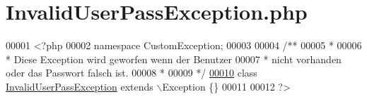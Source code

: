 \hypertarget{_invalid_user_pass_exception_8php}{\section{Invalid\-User\-Pass\-Exception.\-php}
\label{_invalid_user_pass_exception_8php}
}

\begin{DoxyCode}
00001 <?php
00002 \textcolor{keyword}{namespace }CustomException;
00003 \textcolor{comment}{}
00004 \textcolor{comment}{/**}
00005 \textcolor{comment}{ * }
00006 \textcolor{comment}{ * Diese Exception wird geworfen wenn der Benutzer}
00007 \textcolor{comment}{ * nicht vorhanden oder das Passwort falsch ist.}
00008 \textcolor{comment}{ * }
00009 \textcolor{comment}{ */}
\hypertarget{_invalid_user_pass_exception_8php_source_l00010}{}\hyperlink{class_custom_exception_1_1_invalid_user_pass_exception}{00010} \textcolor{keyword}{class }\hyperlink{class_custom_exception_1_1_invalid_user_pass_exception}{InvalidUserPassException} \textcolor{keyword}{extends} \(\backslash\)Exception \{\}
00011 
00012 ?>
\end{DoxyCode}
